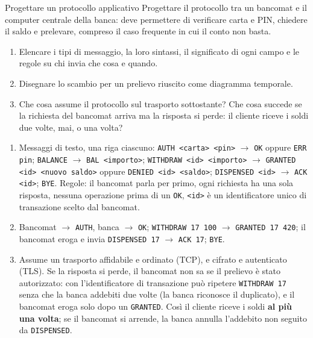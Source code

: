 \begin{esercizio}{Progettare un protocollo applicativo}
Progettare il protocollo tra un bancomat e il computer centrale della banca: deve permettere di verificare carta e PIN, chiedere il saldo
e prelevare, compreso il caso frequente in cui il conto non basta.
\begin{enumerate}[label=(\alph*)]
    \item Elencare i tipi di messaggio, la loro sintassi, il significato di ogni campo e le regole su chi invia che cosa e quando.
    \item Disegnare lo scambio per un prelievo riuscito come diagramma temporale.
    \item Che cosa assume il protocollo sul trasporto sottostante? Che cosa succede se la richiesta del bancomat arriva ma la risposta si
          perde: il cliente riceve i soldi due volte, mai, o una volta?
\end{enumerate}

\svolgimento
\begin{enumerate}[label=(\alph*)]
    \item Messaggi di testo, una riga ciascuno: \texttt{AUTH <carta> <pin>} $\rightarrow$ \texttt{OK} oppure \texttt{ERR pin};
          \texttt{BALANCE} $\rightarrow$ \texttt{BAL <importo>}; \texttt{WITHDRAW <id> <importo>} $\rightarrow$ \texttt{GRANTED <id> <nuovo
          saldo>} oppure \texttt{DENIED <id> <saldo>}; \texttt{DISPENSED <id>} $\rightarrow$ \texttt{ACK <id>}; \texttt{BYE}. Regole: il
          bancomat parla per primo, ogni richiesta ha una sola risposta, nessuna operazione prima di un \texttt{OK}, \texttt{<id>} è un
          identificatore unico di transazione scelto dal bancomat.
    \item Bancomat $\rightarrow$ \texttt{AUTH}, banca $\rightarrow$ \texttt{OK}; \texttt{WITHDRAW 17 100} $\rightarrow$ \texttt{GRANTED 17
          420}; il bancomat eroga e invia \texttt{DISPENSED 17} $\rightarrow$ \texttt{ACK 17}; \texttt{BYE}.
    \item Assume un trasporto affidabile e ordinato (TCP), e cifrato e autenticato (TLS). Se la risposta si perde, il bancomat non sa se il
          prelievo è stato autorizzato: con l'identificatore di transazione può ripetere \texttt{WITHDRAW 17} senza che la banca addebiti
          due volte (la banca riconosce il duplicato), e il bancomat eroga solo dopo un \texttt{GRANTED}. Così il cliente riceve i soldi
          \textbf{al più una volta}; se il bancomat si arrende, la banca annulla l'addebito non seguito da \texttt{DISPENSED}.
\end{enumerate}
\end{esercizio}

